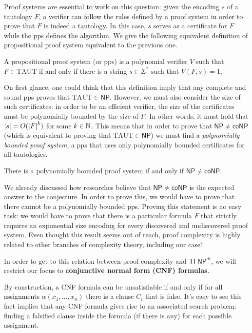 Proof systems are essential to work on this question: given the encoding $s$ of a tautology $F$, a verifier can follow the rules defined by a proof system in order to prove that $F$ is indeed a tautology. In this case, $s$ serves as a certificate for $F$ while the pps defines the algorithm. We give the following equivalent definition of propositional proof system equivalent to the previous one.

\begin{definition}
    A propositional proof system (or pps) is a polynomial verifier $V$ such that $F \in \mathrm{TAUT}$ if and only if there is a string $s \in \Sigma^*$ such that $V(F,s) = 1$.
\end{definition}

On first glance, one could think that this definition imply that any complete and sound pps proves that $\mathrm{TAUT} \in \mathsf{NP}$. However, we must also consider the size of such certificates: in order to be an efficient verifier, the size of the certificates must be polynomially bounded by the size of $F$. In other words, it must hold that $\left|s\right| = O(\left|F\right|^k)$ for some $k \in \mathbb{N}$. This means that in order to prove that $\mathsf{NP} \neq \mathsf{coNP}$ (which is equivalent to proving that $\mathrm{TAUT} \in \mathsf{NP}$) we must find a \textit{polynomially bounded proof system}, a pps that uses only polynomially bounded certificates for all tautologies.

\begin{proposition}
    There is a polynomially bounded proof system if and only if $\mathsf{NP} \neq \mathsf{coNP}$.
\end{proposition}

We already discussed how researches believe that $\mathsf{NP} \neq \mathsf{coNP}$ is the expected answer to the conjecture. In order to prove this, we would have to prove that there cannot be a polynomially bounded pps. Proving this statement is no easy task: we would have to prove that there is a particular formula $F$ that strictly requires an exponential size encoding for every discovered and undiscovered proof system. Even thought this result seems out of reach, proof complexity is highly related to other branches of complexity theory, including our case!

In order to get to this relation between proof complexity and $\mathsf{TFNP}^{dt}$, we will restrict our focus to \textbf{conjunctive normal form (CNF) formulas}. 

By construction, a CNF formula can be unsatisfiable if and only if for all assignments $\alpha(x_1, \ldots, x_n)$ there is a clause $C_i$ that is false. It's easy to see this fact implies that any CNF formula gives rise to an associated search problem: finding a falsified clause inside the formula (if there is any) for each possible assignment.

